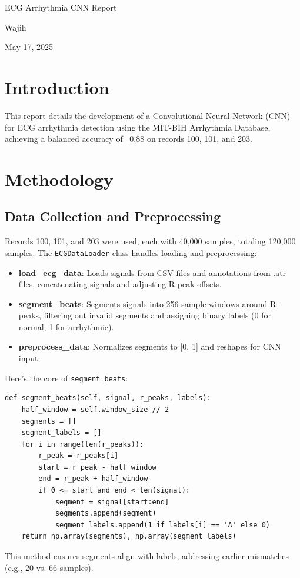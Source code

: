 \documentclass[a4paper,12pt]{article}
\begin{document}
\begin{titlepage}
    \centering
    \vspace*{1cm}
    {\Huge ECG Arrhythmia CNN Report}\par
    \vspace{0.5cm}
    {\Large Wajih}\par
    \vspace{0.5cm}
    {\large May 17, 2025}\par
    \vspace{2cm}
\end{titlepage}

\section*{Introduction}
This report details the development of a Convolutional Neural Network (CNN) for ECG arrhythmia detection using the MIT-BIH Arrhythmia Database, achieving a balanced accuracy of ~0.88 on records 100, 101, and 203.

\section{Methodology}

\subsection{Data Collection and Preprocessing}
Records 100, 101, and 203 were used, each with 40,000 samples, totaling 120,000 samples. The \texttt{ECGDataLoader} class handles loading and preprocessing:
\begin{itemize}
    \item \textbf{load\_ecg\_data}: Loads signals from CSV files and annotations from .atr files, concatenating signals and adjusting R-peak offsets.
    \item \textbf{segment\_beats}: Segments signals into 256-sample windows around R-peaks, filtering out invalid segments and assigning binary labels (0 for normal, 1 for arrhythmic).
    \item \textbf{preprocess\_data}: Normalizes segments to [0, 1] and reshapes for CNN input.
\end{itemize}

Here’s the core of \texttt{segment\_beats}:
\begin{lstlisting}
def segment_beats(self, signal, r_peaks, labels):
    half_window = self.window_size // 2
    segments = []
    segment_labels = []
    for i in range(len(r_peaks)):
        r_peak = r_peaks[i]
        start = r_peak - half_window
        end = r_peak + half_window
        if 0 <= start and end < len(signal):
            segment = signal[start:end]
            segments.append(segment)
            segment_labels.append(1 if labels[i] == 'A' else 0)
    return np.array(segments), np.array(segment_labels)
\end{lstlisting}
This method ensures segments align with labels, addressing earlier mismatches (e.g., 20 vs. 66 samples).
\end{document}
